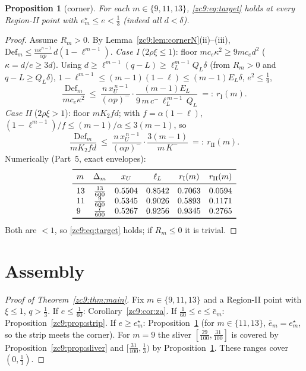 \documentclass[11pt]{amsart}
\newtheorem{proposition}[theorem]{Proposition}
\newcommand{\Def}{\mathrm{Def}}
\begin{document}
\begin{proposition}[corner]\label{zc9:prop:wide}
For each $m\in\{9,11,13\}$, \eqref{zc9:eq:target} holds at every Region-II point
with $e^\star_m\le e<\tfrac13$ (indeed all $d<\delta$).
\end{proposition}

\begin{proof}
Assume $R_m>0$.  By Lemma~\ref{zc9:lem:cornerN}(ii)--(iii),
$\Def_m\le\tfrac{n x^{n-1}}{\alpha p}\,d(1-\ell^{m-1})$.
\emph{Case I} ($2\rho\xi\le1$): floor $mc_e\kappa^2\ge9mc_e d^2$
($\kappa=d/e\ge3d$).  Using $d\ge\ell^{m-1}(q-L)\ge\ell_L^{m-1}Q_L\delta$ (from
$R_m>0$ and $q-L\ge Q_L\delta$), $1-\ell^{m-1}\le(m-1)(1-\ell)\le(m-1)E_L\delta$,
$e^2\le\tfrac19$,
\[
 \frac{\Def_m}{mc_e\kappa^2}\ \le\
 \frac{n\,x_U^{\,n-1}}{(\alpha p)^-}\cdot\frac{(m-1)E_L}
 {9\,m\,c^-\,\ell_L^{\,m-1}\,Q_L}\ =:\ r_{\mathrm I}(m).
\]
\emph{Case II} ($2\rho\xi>1$): floor $mK_2fd$; with $f=\alpha(1-\ell)$,
$(1-\ell^{m-1})/f\le(m-1)/\alpha\le3(m-1)$, so
\[
 \frac{\Def_m}{mK_2fd}\ \le\
 \frac{n\,x_U^{\,n-1}}{(\alpha p)^-}\cdot\frac{3(m-1)}{m\,K^-}\ =:\
 r_{\mathrm{II}}(m).
\]
Numerically (Part~5, exact envelopes):
\[
\begin{array}{lccccc}
\toprule
m & \Delta_m & x_U & \ell_L & r_{\mathrm I}(m) & r_{\mathrm{II}}(m)\\
\midrule
13 & \tfrac{13}{600} & 0.5504 & 0.8542 & 0.7063 & 0.0594\\
11 & \tfrac{9}{600}  & 0.5345 & 0.9026 & 0.5893 & 0.1171\\
 9 & \tfrac{7}{600}  & 0.5267 & 0.9256 & 0.9345 & 0.2765\\
\bottomrule
\end{array}
\]
Both are $<1$, so \eqref{zc9:eq:target} holds; if $R_m\le0$ it is trivial.
\end{proof}

\section{Assembly}\label{zc9:sec:assembly}

\begin{proof}[Proof of Theorem~\ref{zc9:thm:main}]
Fix $m\in\{9,11,13\}$ and a Region-II point with $\xi\le1$, $q>\tfrac13$.  If
$e\le\tfrac1{60}$: Corollary~\ref{zc9:cor:za}.  If
$\tfrac1{60}\le e\le\bar e_m$: Proposition~\ref{zc9:prop:strip}.  If
$e\ge e^\star_m$: Proposition~\ref{zc9:prop:wide} (for $m\in\{11,13\}$,
$\bar e_m=e^\star_m$, so the strip meets the corner).  For $m=9$ the sliver
$[\tfrac{29}{100},\tfrac{31}{100}]$ is covered by
Proposition~\ref{zc9:prop:sliver} and $[\tfrac{31}{100},\tfrac13)$ by
Proposition~\ref{zc9:prop:wide}.  These ranges cover $(0,\tfrac13)$.
\end{proof}
\end{document}
